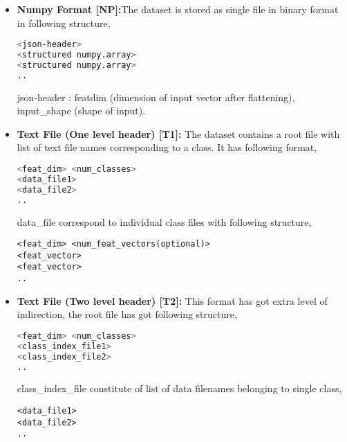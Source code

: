 \begin{itemize}
\item{\textbf {Numpy Format [NP]:}The dataset is stored as single file in binary format in following structure,
\begin{lstlisting}[language=bash,basicstyle=\small] 
<json-header>
<structured numpy.array>
<structured numpy.array>
..
\end{lstlisting}
json-header  : featdim (dimension of input vector after flattening), input\_shape (shape of input).}

\item{\textbf {Text File (One level header) [T1]:} The dataset contains a root file with list of  text file names corresponding to a class. It has following format,
\begin{lstlisting}[language=bash,basicstyle=\small] 
<feat_dim> <num_classes>
<data_file1>
<data_file2>
..
\end{lstlisting}
data\_file correspond to individual class files with following structure,
\begin{lstlisting}[basicstyle=\small] 
<feat_dim> <num_feat_vectors(optional)>
<feat_vector>
<feat_vector>
..
\end{lstlisting}}

\item{\textbf {Text File (Two level header) [T2]:} This format has got extra level of indirection, the root file has got following structure,
\begin{lstlisting}[language=bash,basicstyle=\small] 
<feat_dim> <num_classes>
<class_index_file1>
<class_index_file2>
..
\end{lstlisting}
class\_index\_file constitute of list of data filenames belonging to single class, 
\begin{lstlisting}[basicstyle=\small] 
<data_file1>
<data_file2>
..
\end{lstlisting}}
\end{itemize}

